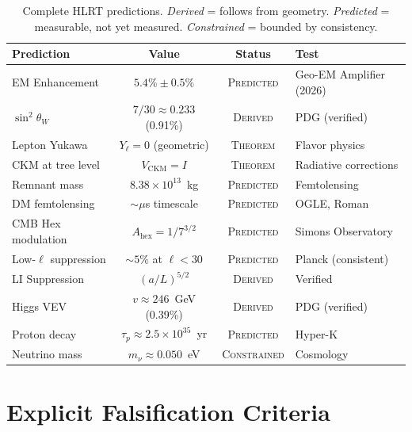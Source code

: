 \documentclass[11pt,letterpaper]{article}
\begin{document}
\begin{table}[h]
\centering
\small
\begin{tabular}{lccl}
\toprule
\textbf{Prediction} & \textbf{Value} & \textbf{Status} & \textbf{Test} \\
\midrule
EM Enhancement          & $5.4\%\pm0.5\%$             & \textsc{Predicted}  & Geo-EM Amplifier (2026) \\
$\sin^2\!\theta_W$      & $7/30\approx0.233$ (0.91\%) & \textsc{Derived}    & PDG (verified) \\
Lepton Yukawa           & $Y_\ell = 0$ (geometric)    & \textsc{Theorem}    & Flavor physics \\
CKM at tree level       & $V_\mathrm{CKM} = I$        & \textsc{Theorem}    & Radiative corrections \\
Remnant mass            & $8.38\times10^{13}$~kg      & \textsc{Predicted}  & Femtolensing \\
DM femtolensing         & $\sim\mu$s timescale        & \textsc{Predicted}  & OGLE, Roman \\
CMB Hex modulation      & $A_\mathrm{hex} = 1/7^{3/2}$& \textsc{Predicted}  & Simons Observatory \\
Low-$\ell$ suppression  & $\sim5\%$ at $\ell<30$      & \textsc{Predicted}  & Planck (consistent) \\
LI Suppression          & $(a/L)^{5/2}$               & \textsc{Derived}    & Verified \\
Higgs VEV               & $v\approx246$~GeV (0.39\%)  & \textsc{Derived}    & PDG (verified) \\
Proton decay            & $\tau_p\approx2.5\times10^{35}$~yr & \textsc{Predicted} & Hyper-K \\
Neutrino mass           & $m_\nu\approx0.050$~eV      & \textsc{Constrained}& Cosmology \\
\bottomrule
\end{tabular}
\caption{Complete HLRT predictions.  \emph{Derived} = follows from geometry.
\emph{Predicted} = measurable, not yet measured.  \emph{Constrained} = bounded
by consistency.}
\end{table}

\section{Explicit Falsification Criteria}
\end{document}
